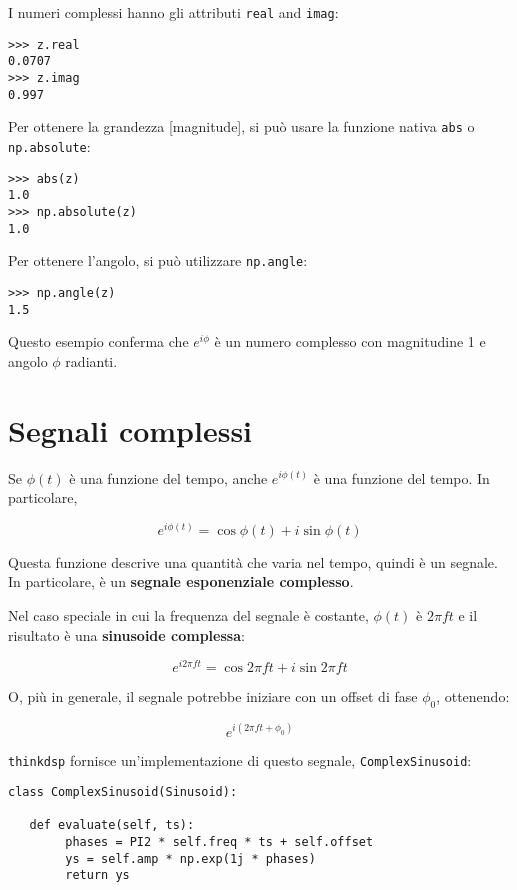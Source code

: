 \documentclass[12pt,a4paper]{book}
\begin{document}
I numeri complessi hanno gli attributi {\tt real} and {\tt imag}:

\begin{verbatim} 
>>> z.real
0.0707
>>> z.imag
0.997
 \end{verbatim} 

Per ottenere la grandezza [magnitude], si può usare la funzione nativa {\tt abs} o {\tt np.absolute}:

\begin{verbatim} 
>>> abs(z)
1.0
>>> np.absolute(z)
1.0
 \end{verbatim} 

Per ottenere l'angolo, si può utilizzare {\tt np.angle}:

\begin{verbatim} 
>>> np.angle(z)
1.5
 \end{verbatim} 

Questo esempio conferma che $e^{i \phi}$ è un numero complesso con magnitudine 1 e angolo $\phi$ radianti.

\section{Segnali complessi} 

Se $\phi(t)$ è una funzione del tempo, anche $e^{i \phi(t)}$ è una funzione del tempo. In particolare,

%
\[ e^{i \phi(t)} = \cos \phi(t) + i \sin \phi(t) \] 

%
Questa funzione descrive una quantità che varia nel tempo, quindi è un segnale. In particolare, è un {\bf segnale esponenziale complesso}.

Nel caso speciale in cui la frequenza del segnale è costante, $\phi(t)$ è $2 \pi f t$ e il risultato è una {\bf sinusoide complessa}:

%
\[ e^{i 2 \pi f t} = \cos 2 \pi f t + i \sin 2 \pi f t \] 

%
O, più in generale, il segnale potrebbe iniziare con un offset di fase $\phi_0$, ottenendo:

%
\[ e^{i (2 \pi f t + \phi_0)} \] 

%
{\tt thinkdsp} fornisce un'implementazione di questo segnale, {\tt ComplexSinusoid}:

\begin{verbatim} 
class ComplexSinusoid(Sinusoid):

   def evaluate(self, ts):
        phases = PI2 * self.freq * ts + self.offset
        ys = self.amp * np.exp(1j * phases)
        return ys
 \end{verbatim} 
\end{document}
